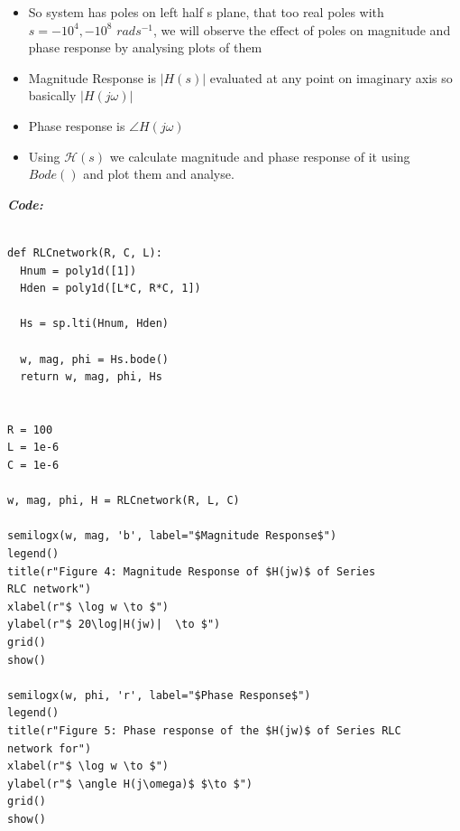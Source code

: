 \documentclass[11pt, a4paper]{article}
\begin{document}
\begin{itemize}
\item
  So system has poles on left half s plane, that too real poles with $
  s = -10^{4},-10^{8}$ $rads^{-1}$, we will observe the
  effect of poles on magnitude and phase response by analysing plots of
  them
\item
  Magnitude Response is \(|H(s)|\) evaluated at any point on imaginary
  axis so basically \(|H(j\omega)|\)
\item
  Phase response is \(\angle H(j\omega)\)
\item
  Using \(\mathcal{H}(s)\) we calculate magnitude and phase response of
  it using \(Bode()\) and plot them and analyse.
\end{itemize}

\textit{\textbf{Code:}}
\begin{lstlisting}
  
def RLCnetwork(R, C, L):
  Hnum = poly1d([1])
  Hden = poly1d([L*C, R*C, 1])

  Hs = sp.lti(Hnum, Hden)

  w, mag, phi = Hs.bode()
  return w, mag, phi, Hs


R = 100
L = 1e-6
C = 1e-6

w, mag, phi, H = RLCnetwork(R, L, C)

semilogx(w, mag, 'b', label="$Magnitude Response$")
legend()
title(r"Figure 4: Magnitude Response of $H(jw)$ of Series 
RLC network")
xlabel(r"$ \log w \to $")
ylabel(r"$ 20\log|H(jw)|  \to $")
grid()
show()

semilogx(w, phi, 'r', label="$Phase Response$")
legend()
title(r"Figure 5: Phase response of the $H(jw)$ of Series RLC 
network for")
xlabel(r"$ \log w \to $")
ylabel(r"$ \angle H(j\omega)$ $\to $")
grid()
show()
\end{lstlisting}
\newpage
\end{document}
